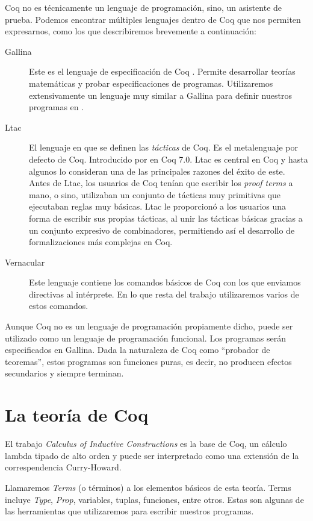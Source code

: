 Coq no es técnicamente un lenguaje de programación, sino, un asistente de prueba. Podemos encontrar múltiples lenguajes dentro de Coq que nos permiten expresarnos, como los que describiremos brevemente a continuación:
\begin{description}
    \item[Gallina] Este es el lenguaje de especificación de Coq \cite{Gallina}. Permite desarrollar teorías matemáticas y probar especificaciones de programas. Utilizaremos extensivamente un lenguaje muy similar a Gallina para definir nuestros programas en \Mtac.
    \item[Ltac] El lenguaje en que se definen las \textit{tácticas} de Coq. Es el metalenguaje por defecto de Coq. Introducido por \citeauthor{DBLP:conf/lpar/Delahaye00} en Coq 7.0. Ltac \cite{DBLP:conf/lpar/Delahaye00} es central en Coq y hasta algunos lo consideran una de las principales razones del éxito de este. Antes de Ltac, los usuarios de Coq tenían que escribir los \textit{proof terms} a mano, o sino, utilizaban un conjunto de tácticas muy primitivas que ejecutaban reglas muy básicas. Ltac le proporcionó a los usuarios una forma de escribir sus propias tácticas, al unir las tácticas básicas gracias a un conjunto expresivo de combinadores, permitiendo así el desarrollo de formalizaciones más complejas en Coq.
    \item[Vernacular] Este lenguaje contiene los comandos básicos de Coq con los que enviamos directivas al intérprete.
    En lo que resta del trabajo utilizaremos varios de estos comandos.
\end{description}

Aunque Coq no es un lenguaje de programación propiamente dicho, puede ser utilizado como un lenguaje de programación funcional.
Los programas serán especificados en Gallina. Dada la naturaleza de Coq como ``probador de teoremas'', estos programas son funciones puras, es decir, no producen efectos secundarios y siempre terminan.

\section{La teoría de Coq}

El trabajo \textit{Calculus of Inductive Constructions} \cite{CIC} es la base de Coq, un cálculo lambda tipado de alto orden y puede ser interpretado como una extensión de la correspendencia Curry-Howard.

Llamaremos \textit{Terms} (o términos) a los elementos básicos de esta teoría. Terms incluye \textit{Type}, \textit{Prop}, variables, tuplas, funciones, entre otros. Estas son algunas de las herramientas que utilizaremos para escribir nuestros programas.

